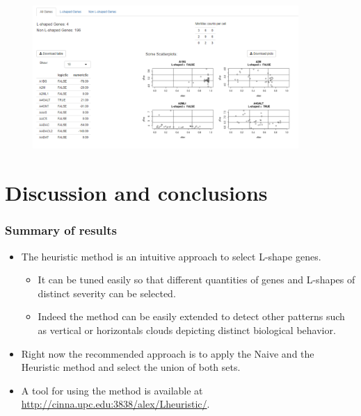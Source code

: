 \documentclass[handout]{beamer}
\begin{document}
{\begin{center}
	\begin{figure}[h]          
		\includegraphics[width=0.9\textwidth]{images/shinyApp3.png}
	\end{figure}
\end{center}
}

\section{Discussion and conclusions}

\begin{frame}
	\frametitle{Summary of results}
 \begin{itemize}
 	\item The heuristic method is  an intuitive approach to select L-shape genes.
 	\begin{itemize}
 	\item It can be tuned easily so that different quantities of genes and L-shapes of distinct severity can be selected.
 	\item Indeed the method can be easily extended to detect other patterns such as vertical or horizontals clouds depicting distinct biological behavior. 
 	 \end{itemize} 
  
 	\item Right now the recommended approach is to apply the Naive and the Heuristic method and select the union of both sets.
 	\item A tool for using the method is available at \url{http://cinna.upc.edu:3838/alex/Lheuristic/}.
 \end{itemize} 
\end{frame}
\end{document}

